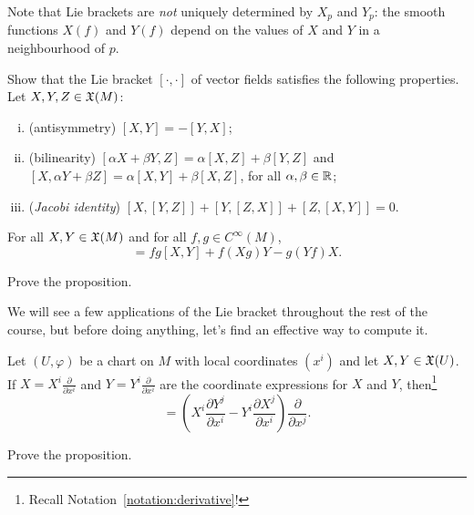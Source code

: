 \begin{remark}
	Note that Lie brackets are \emph{not} uniquely determined by $X_p$ and $Y_p$: the smooth functions $X(f)$ and $Y(f)$ depend on the values of $X$ and $Y$ in a neighbourhood of $p$.
\end{remark}

\begin{exercise}\label{ex:vfliealgebra}
	Show that the Lie bracket $[\cdot,\cdot]$ of vector fields satisfies the following properties. Let $X,Y,Z\in\mathfrak{X}(M)$:
	\begin{enumerate}[(i)]
		\item (antisymmetry) $[X, Y] = - [Y, X]$;
		\item (bilinearity) $[\alpha X + \beta Y, Z] = \alpha [X, Z] + \beta [Y, Z]$ and $[X, \alpha Y + \beta Z] = \alpha [X, Y] + \beta [X, Z]$, for all $\alpha,\beta \in\mathbb{R}$;
		\item (\emph{Jacobi identity}) $[X,[Y,Z]] + [Y,[Z,X]] + [Z,[X,Y]] = 0$.
	\end{enumerate}
\end{exercise}

\begin{proposition}
	For all $X, Y \in \mathfrak{X}(M)$ and for all $f,g\in C^\infty(M)$,
	\begin{equation}
		[fX, gY] = fg[X,Y] + f(Xg)Y - g(Yf)X.
	\end{equation}
\end{proposition}
\begin{exercise}
	Prove the proposition.
\end{exercise}

We will see a few applications of the Lie bracket throughout the rest of the course, but before doing anything, let's find an effective way to compute it.

\begin{proposition}
	Let $(U, \varphi)$ be a chart on $M$ with local coordinates $(x^i)$ and let $X,Y\in\mathfrak{X}(U)$.
	If $X = X^i \frac{\partial }{\partial x^i}$ and $Y = Y^i \frac{\partial}{\partial x^i}$ are the coordinate expressions for $X$ and $Y$, then\footnote{Recall Notation~\ref{notation:derivative}!}
	\begin{equation}
		[X,Y] = \left(X^i\frac{\partial Y^j}{\partial x^i} - Y^i\frac{\partial X^j}{\partial x^i}\right)\frac{\partial}{\partial x^j}.
	\end{equation}
\end{proposition}
\begin{exercise}
	Prove the proposition.
\end{exercise}

